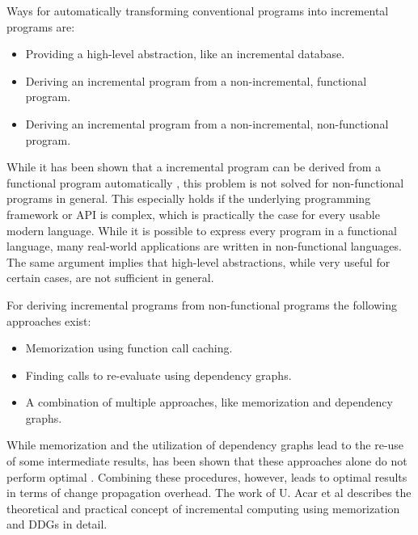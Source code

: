 Ways for automatically transforming conventional programs into incremental programs are: 
\begin{itemize}
\item Providing a high-level abstraction, like an incremental database. \cite{Peng2010}
\item Deriving an incremental program from a non-incremental, functional program. \cite{liu1995systematic}  \cite{ley2008compiling} 
\item Deriving an incremental program from a non-incremental, non-functional program. \cite{heydon2000caching} \cite{Pugh1989} \cite{cohen1991dynamic} \cite{naiadIncremental} \cite{Hammer2009} \cite{Chen2014} \cite{Acar2008} \cite{acar2006adaptive} 
\end{itemize}

While it has been shown that a incremental program can be derived from a functional program automatically \cite{ley2008compiling}, this problem is not solved for non-functional programs in general. This especially holds if the underlying programming framework or API is complex, which is practically the case for every usable modern language. While it is possible to express every program in a functional language, many real-world applications are written in non-functional languages. 
The same argument implies that high-level abstractions, while very useful for certain cases, are not sufficient in general. 

For deriving incremental programs from non-functional programs the following approaches exist: 
\begin{itemize}
\item Memorization using function call caching. \cite{heydon2000caching} \cite{Pugh1989} 
\item Finding calls to re-evaluate using dependency graphs. \cite{cohen1991dynamic}
\item A combination of multiple approaches, like memorization and dependency graphs. \cite{Hammer2009} \cite{Chen2014} \cite{Acar2008} \cite{acar2006adaptive} \cite{naiadIncremental}
\end{itemize}

While memorization and the utilization of dependency graphs lead to the re-use of some intermediate results, has been shown that these approaches alone do not perform optimal \cite{Acar2005thesis}. Combining these procedures, however, leads to optimal results \cite{Acar2005thesis} in terms of change propagation overhead. The work of U. Acar et al\cite{Acar2005thesis} describes the theoretical and practical concept of incremental computing using memorization and DDGs in detail.

